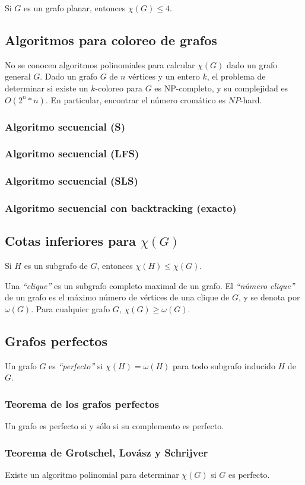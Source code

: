 Si $G$ es un grafo planar, entonces $\chi(G) \leq 4$.

\subsection{Algoritmos para coloreo de grafos}

No se conocen algoritmos polinomiales para calcular $\chi(G)$ dado un grafo general $G$. Dado un grafo $G$ de $n$ v\'ertices y un entero $k$, el problema de determinar si existe un $k$-coloreo para $G$ es NP-completo, y su complejidad es $O(2^n * n)$. En particular, encontrar el n\'umero crom\'atico es $NP$-hard.

\newpage
\subsubsection{Algoritmo secuencial (S)}
\subsubsection{Algoritmo secuencial (LFS)}
\subsubsection{Algoritmo secuencial (SLS)}
\subsubsection{Algoritmo secuencial con backtracking (exacto)}

\subsection{Cotas inferiores para $\chi(G)$}

Si $H$ es un subgrafo de $G$, entonces $\chi(H) \leq \chi(G)$.

Una \emph{``clique''} es un subgrafo completo maximal de un grafo. El \emph{``n\'umero clique''} de un grafo es el m\'aximo n\'umero de v\'ertices de una clique de $G$, y se denota por $\omega(G)$. Para cualquier grafo $G$, $\chi(G) \geq \omega(G)$.

\subsection{Grafos perfectos}

Un grafo $G$ es \emph{``perfecto''} si $\chi(H) = \omega(H)$ para todo subgrafo inducido $H$ de $G$.

\subsubsection{Teorema de los grafos perfectos}

Un grafo es perfecto si y s\'olo si su complemento es perfecto.

\subsubsection{Teorema de Grotschel, Lov\'asz y Schrijver}

Existe un algoritmo polinomial para determinar $\chi(G)$ si $G$ es perfecto.
